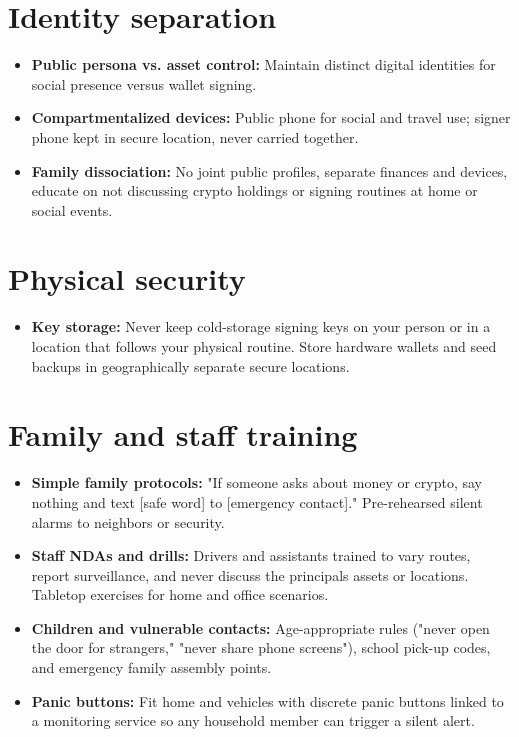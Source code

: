 \section{Identity separation}\label{identity-separation}

\begin{itemize}
\tightlist
\item
  \textbf{Public persona vs. asset control:} Maintain distinct digital identities for social presence versus wallet signing.
\item
  \textbf{Compartmentalized devices:} Public phone for social and travel use; signer phone kept in secure location, never carried together.
\item
  \textbf{Family dissociation:} No joint public profiles, separate finances and devices, educate on not discussing crypto holdings or signing routines at home or social events.
\end{itemize}

\section{Physical security}\label{physical-security-1}

\begin{itemize}
\tightlist
\item
  \textbf{Key storage:} Never keep cold-storage signing keys on your person or in a location that follows your physical routine. Store hardware wallets and seed backups in geographically separate secure locations.
\end{itemize}

\section{Family and staff training}\label{family-and-staff-training}

\begin{itemize}
\tightlist
\item
  \textbf{Simple family protocols:} "If someone asks about money or crypto, say nothing and text {[}safe word{]} to {[}emergency contact{]}." Pre-rehearsed silent alarms to neighbors or security.
\item
  \textbf{Staff NDAs and drills:} Drivers and assistants trained to vary routes, report surveillance, and never discuss the principal\textquotesingle s assets or locations. Tabletop exercises for home and office scenarios.
\item
  \textbf{Children and vulnerable contacts:} Age-appropriate rules ("never open the door for strangers," "never share phone screens"), school pick-up codes, and emergency family assembly points.
\item
  \textbf{Panic buttons:} Fit home and vehicles with discrete panic buttons linked to a monitoring service so any household member can trigger a silent alert.
\end{itemize}

